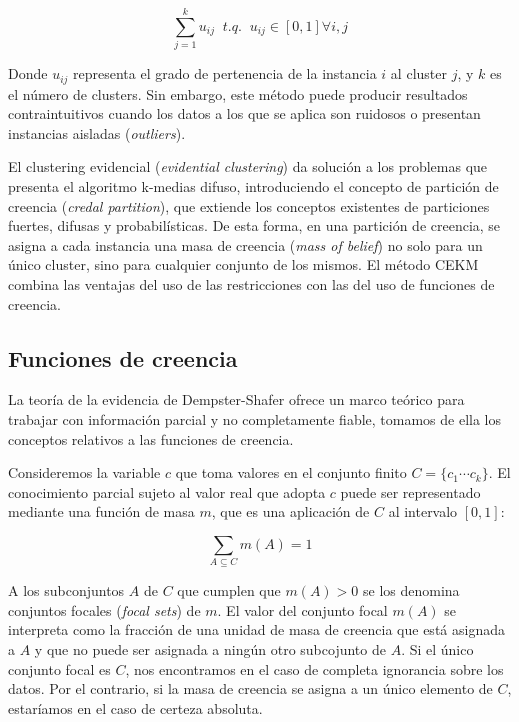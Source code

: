 \begin{equation}
\sum_{j=1}^{k} u_{ij} \;\; t.q. \;\; u_{ij} \in [0,1] \forall i,j
\label{eqn2}
\end{equation}

Donde $u_{ij}$ representa el grado de pertenencia de la instancia $i$ al cluster $j$, y $k$ es el número de clusters. Sin embargo, este método puede producir resultados contraintuitivos cuando los datos a los que se aplica son ruidosos o presentan instancias aisladas (\textit{outliers}).

El clustering evidencial (\textit{evidential clustering}) da solución a los problemas que presenta el algoritmo k-medias difuso, introduciendo el concepto de partición de creencia (\textit{credal partition}), que extiende los conceptos existentes de particiones fuertes, difusas y probabilísticas. De esta forma, en una partición de creencia, se asigna a cada instancia una masa de creencia (\textit{mass of belief}) no solo para un único cluster, sino para cualquier conjunto de los mismos. El método \acs{CEKM} combina las ventajas del uso de las restricciones con las del uso de funciones de creencia.

\subsection{Funciones de creencia}

La teoría de la evidencia de Dempster-Shafer ofrece un marco teórico para trabajar con información parcial y no completamente fiable, tomamos de ella los conceptos relativos a las funciones de creencia.

Consideremos la variable $c$ que toma valores en el conjunto finito $C = \{c_1 \cdots c_k \}$. El conocimiento parcial sujeto al valor real que adopta $c$ puede ser representado mediante una función de masa $m$, que es una aplicación de $C$ al intervalo $[0,1]$:

\begin{equation}
\sum_{A \subseteq C} m(A) = 1
\label{eqn3}
\end{equation}

A los subconjuntos $A$ de $C$ que cumplen que $m(A) > 0$ se los denomina conjuntos focales (\textit{focal sets}) de $m$. El valor del conjunto focal $m(A)$ se interpreta como la fracción de una unidad de masa de creencia que está asignada a $A$ y que no puede ser asignada a ningún otro subcojunto de $A$. Si el único conjunto focal es $C$, nos encontramos en el caso de completa ignorancia sobre los datos. Por el contrario, si la masa de creencia se asigna a un único elemento de $C$, estaríamos en el caso de certeza absoluta.


